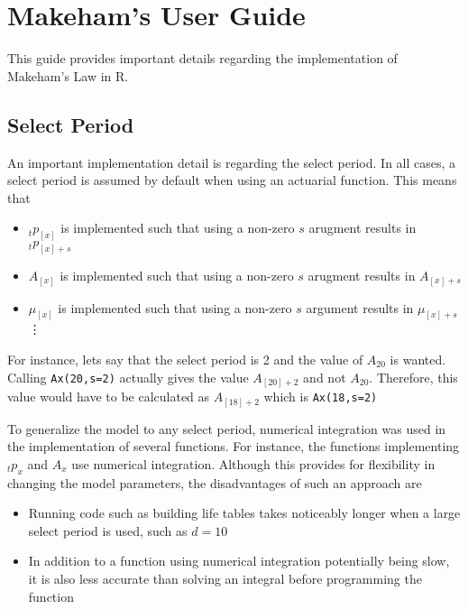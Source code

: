 \documentclass{report}
\begin{document}
\large{}


\section*{Makeham's User Guide} 

This guide provides important details regarding the implementation of Makeham's Law in R.

\subsection*{Select Period}

An important implementation detail is regarding the select period. In all cases, a select period is assumed by default when using an actuarial function. This means that

\begin{itemize}
\item ${}_tp_{[x]}$ is implemented such that using a non-zero $s$ arugment results in ${}_tp_{[x]+s}$
\item $A_{[x]}$ is implemented such that using a non-zero $s$ arugment results in $A_{[x]+s}$
\item $\mu_{[x]}$ is implemented such that using a non-zero $s$ argument results in $\mu_{[x]+s}$ \\
\vdots
\end{itemize}

For instance, lets say that the select period is 2 and the value of $A_{20}$ is wanted. Calling \texttt{Ax(20,s=2)} actually gives the value $A_{[20]+2}$ and not $A_{20}$. Therefore, this value would have to be calculated as $A_{[18]+2}$ which is \texttt{Ax(18,s=2)}

To generalize the model to any select period, numerical integration was used in the implementation of several functions. For instance, the functions implementing ${}_tp_{x}$ and $A_{x}$ use numerical integration. Although this provides for flexibility in changing the model parameters, the disadvantages of such an approach are
\begin{itemize}
\item Running code such as building life tables takes noticeably longer when a large select period is used, such as $d=10$
\item In addition to a function using numerical integration potentially being slow, it is also less accurate than solving an integral before programming the function
\end{itemize}
\end{document}
